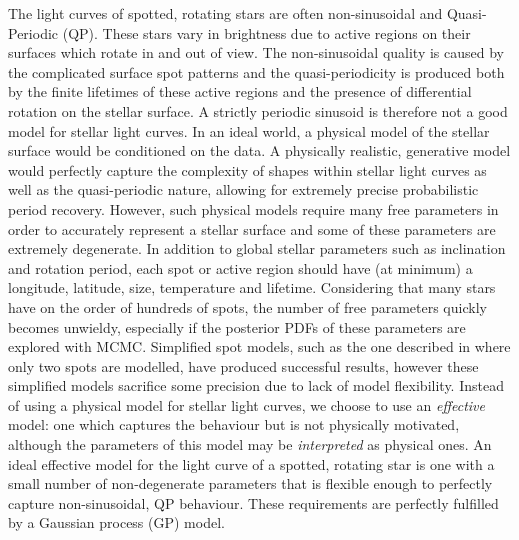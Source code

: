 The light curves of spotted, rotating stars are often non-sinusoidal and
Quasi-Periodic (QP).
These stars vary in brightness due to active regions on their surfaces which
rotate in and out of view.
The non-sinusoidal quality is caused by the complicated surface spot patterns
and the quasi-periodicity is produced both by the finite lifetimes of these
active regions and the presence of differential rotation on the stellar
surface.
A strictly periodic sinusoid is therefore not a good model for stellar light
curves.
In an ideal world, a physical model of the stellar surface would be
conditioned on the data.
A physically realistic, generative model would perfectly capture the complexity
of shapes within stellar light curves as well as the quasi-periodic nature,
allowing for extremely precise probabilistic period recovery.
However, such physical models require many free parameters in order to
accurately represent a stellar surface and some of these parameters are
extremely degenerate.
In addition to global stellar parameters such as inclination and rotation
period, each spot or active region should have (at minimum) a longitude,
latitude, size, temperature and lifetime.
Considering that many stars have on the order of hundreds of spots, the number
of free parameters quickly becomes unwieldy, especially if the posterior PDFs
of these parameters are explored with MCMC.
Simplified spot models, such as the one described in \citet{Lanza2014} where
only two spots are modelled, have produced successful results, however these
simplified models sacrifice some precision due to lack of model flexibility.
Instead of using a physical model for stellar light curves, we choose to use
an {\it effective} model: one which captures the behaviour but is not
physically motivated, although the parameters of this model may be {\it
interpreted} as physical ones.
An ideal effective model for the light curve of a spotted, rotating star is
one with a small number of non-degenerate parameters that is flexible enough
to perfectly capture non-sinusoidal, QP behaviour.
These requirements are perfectly fulfilled by a Gaussian process (GP) model.

